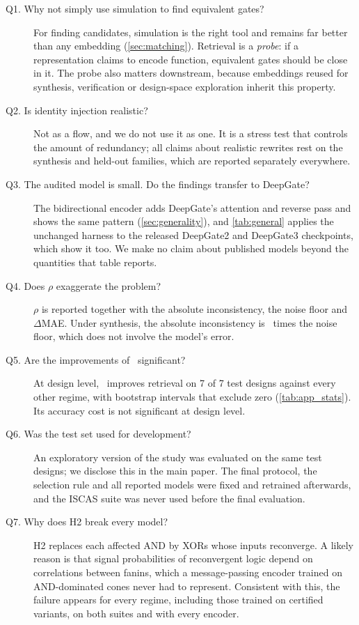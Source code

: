 \begin{description}
\item[Q1. Why not simply use simulation to find equivalent gates?] For finding candidates, simulation is the right
tool and remains far better than any embedding (\cref{sec:matching}). Retrieval is a \emph{probe}: if a representation
claims to encode function, equivalent gates should be close in it. The probe also matters downstream, because
embeddings reused for synthesis, verification or design-space exploration inherit this property.

\item[Q2. Is identity injection realistic?] Not as a flow, and we do not use it as one. It is a stress test that
controls the amount of redundancy; all claims about realistic rewrites rest on the synthesis and held-out families,
which are reported separately everywhere.

\item[Q3. The audited model is small. Do the findings transfer to DeepGate?] The bidirectional encoder adds
DeepGate's attention and reverse pass and shows the same pattern (\cref{sec:generality}), and \cref{tab:general}
applies the unchanged harness to the released DeepGate2 and DeepGate3 checkpoints, which show it too. We make no
claim about published models beyond the quantities that table reports.

\item[Q4. Does $\rho$ exaggerate the problem?] $\rho$ is reported together with the absolute inconsistency, the
noise floor and $\Delta$MAE. Under synthesis, the absolute inconsistency is \IncSynOverNoiseBase\ times the noise floor,
which does not involve the model's error.

\item[Q5. Are the improvements of \ours\ significant?] At design level, \ours\ improves retrieval on 7 of 7 test
designs against every other regime, with bootstrap intervals that exclude zero (\cref{tab:app_stats}). Its accuracy
cost is not significant at design level.

\item[Q6. Was the test set used for development?] An exploratory version of the study was evaluated on the same
test designs; we disclose this in the main paper. The final protocol, the selection rule and all reported models
were fixed and retrained afterwards, and the ISCAS suite was never used before the final evaluation.

\item[Q7. Why does H2 break every model?] H2 replaces each affected AND by XORs whose inputs reconverge. A likely reason is that signal
probabilities of reconvergent logic depend on correlations between fanins, which a message-passing encoder trained on
AND-dominated cones never had to represent. Consistent with this, the failure appears for every regime, including those
trained on certified variants, on both suites and with every encoder.


\end{description}
